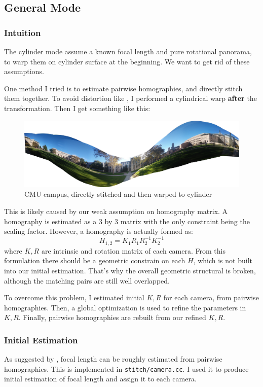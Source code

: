 
\subsection{General Mode}
\subsubsection{Intuition}
The cylinder mode assume a known focal length and pure rotational panorama, to
warp them on cylinder surface at the beginning.
We want to get rid of these assumptions.

One method I tried is to estimate pairwise homographies,
and directly stitch them together. To avoid distortion like ,
I performed a cylindrical warp \textbf{after} the transformation.
Then I get something like this:
\begin{figure}[H]
  \centering
  \includegraphics[width=1\textwidth]{res/CMU1-noestimate.jpg}
  \caption{CMU campus, directly stitched and then warped to cylinder}
\end{figure}

This is likely caused by our weak assumption on homography matrix.
A homography is estimated as a 3 by 3 matrix with the only
constraint being the scaling factor. However,
a homography is actually formed as:
\[ H_{1,2} = K_1R_1R_2^{-1}K_2^{-1}\]
where $K,R$ are intrinsic and rotation matrix of each camera.
From this formulation there should be a geometric constrain on each $H$,
which is not built into our initial estimation.
That's why the overall geometric structural is broken, although the matching pairs
are still well overlapped.

To overcome this problem, I estimated initial $K, R$ for each camera, from pairwise homographies.
Then, a global optimization is used to refine the parameters in $K, R$.
Finally, pairwise homographies are rebuilt from our refined $K, R$.

\subsubsection{Initial Estimation}
As suggested by \cite{focal}, focal length
can be roughly estimated from pairwise homographies. This is implemented in \verb|stitch/camera.cc|.
I used it to produce initial estimation of
focal length and assign it to each camera.

